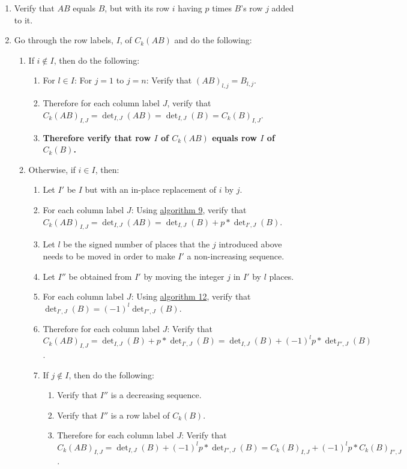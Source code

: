 \documentclass[twocolumn]{article}
\begin{document}
			\begin{enumerate}
				\item Verify that $AB$ equals $B$, but with its row $i$ having $p$ times $B$'s row $j$ added to it.
				\item Go through the row labels, $I$, of $C_k(AB)$ and do the following:
				\begin{enumerate}
					\item If $i\notin I$, then do the following:
					\begin{enumerate}
						\item For $l\in I$: For $j=1$ to $j=n$: Verify that $(AB)_{l,j}=B_{l,j}$.
						\item Therefore for each column label $J$, verify that ${C_k(AB)}_{I,J}=\det_{I,J}(AB)=\det_{I,J}(B)={C_k(B)}_{I,J}$.
						\item \textbf{Therefore verify that row $I$ of $C_k(AB)$ equals row $I$ of $C_k(B)$.}
					\end{enumerate}
					\item Otherwise, if $i\in I$, then:
					\begin{enumerate}
						\item Let $I'$ be $I$ but with an in-place replacement of $i$ by $j$.
						\item For each column label $J$: Using \hyperref[sec:algorithm 9]{algorithm 9}, verify that ${C_k(AB)}_{I,J}=\det_{I,J}(AB)=\det_{I,J}(B)+p*\det_{I',J}(B)$.
						\item Let $l$ be the signed number of places that the $j$ introduced above needs to be moved in order to make $I'$ a non-increasing sequence.
						\item Let $I''$ be obtained from $I'$ by moving the integer $j$ in $I'$ by $l$ places.
						\item For each column label $J$: Using \hyperref[sec:algorithm 12]{algorithm 12}, verify that $\det_{I',J}(B)=(-1)^l\det_{I'',J}(B)$.
						\item Therefore for each column label $J$: Verify that ${C_k(AB)}_{I,J}=\det_{I,J}(B)+p*\det_{I',J}(B)=\det_{I,J}(B)+(-1)^lp*\det_{I'',J}(B)$.
						\item If $j\notin I$, then do the following:
						\begin{enumerate}
							\item Verify that $I''$ is a decreasing sequence.
							\item Verify that $I''$ is a row label of $C_k(B)$.
							\item Therefore for each column label $J$: Verify that ${C_k(AB)}_{I,J}=\det_{I,J}(B)+(-1)^lp*\det_{I'',J}(B)={C_k(B)}_{I,J}+(-1)^lp*{C_k(B)}_{I'',J}$.

\end{enumerate}
\end{enumerate}
\end{enumerate}
\end{enumerate}
\end{document}
